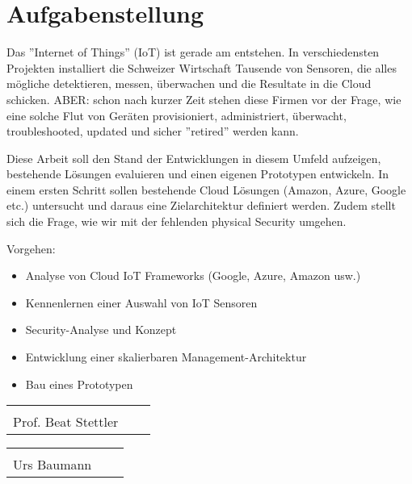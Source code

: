 \chapter*{Aufgabenstellung}
Das ''Internet of Things'' (IoT) ist gerade am entstehen. In verschiedensten Projekten installiert die Schweizer Wirtschaft Tausende von Sensoren, die alles mögliche detektieren, messen, überwachen und die Resultate in die Cloud schicken. ABER: schon nach kurzer Zeit stehen diese Firmen vor der Frage, wie eine solche Flut von Geräten provisioniert, administriert, überwacht, troubleshooted, updated und sicher ''retired'' werden kann. 

Diese Arbeit soll den Stand der Entwicklungen in diesem Umfeld aufzeigen, bestehende Lösungen evaluieren und einen eigenen Prototypen entwickeln. In einem ersten Schritt sollen bestehende Cloud Lösungen (Amazon, Azure, Google etc.) untersucht und daraus eine Zielarchitektur definiert werden. Zudem stellt sich die Frage, wie wir mit der fehlenden physical Security umgehen.

Vorgehen:
\begin{itemize}
\item Analyse von Cloud IoT Frameworks (Google, Azure, Amazon usw.)
\item Kennenlernen einer Auswahl von IoT Sensoren
\item Security-Analyse und Konzept
\item Entwicklung einer skalierbaren Management-Architektur
\item Bau eines Prototypen
\end{itemize}



\vspace{1,5 cm} 
\begin{tabular}{p{7cm}p{.5cm}l}
\dotfill \\
Prof. Beat Stettler
\end{tabular}%
\hfill 
\begin{tabular}{p{7cm}p{.5cm}l}
\dotfill \\ 
Urs Baumann
\end{tabular}